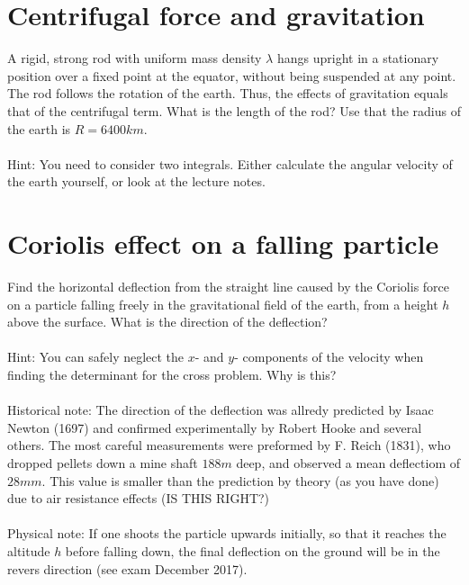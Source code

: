 \documentclass{article}
\begin{document}
    \section{Centrifugal force and gravitation}


    A rigid, strong rod with uniform mass density $\lambda$ hangs upright in a stationary position over a fixed point at the equator, without being suspended at any point. The rod follows the rotation of the earth. Thus, the effects of gravitation equals that of the centrifugal term. What is the length of the rod? Use that the radius of the earth is $R = 6400 \si{km}$.
    \\
    \\
    Hint: You need to consider two integrals. Either calculate the angular velocity of the earth yourself, or look at the lecture notes.

    \section{Coriolis effect on a falling particle}
    Find the horizontal deflection from the straight line caused by the Coriolis force on a particle falling freely in the gravitational field of the earth, from a height $h$ above the surface. What is the direction of the deflection?
    \\
    \\
    Hint: You can safely neglect the $x$- and $y$- components of the velocity when finding the determinant for the cross problem. Why is this?
    \\
    \\
    Historical note: The direction of the deflection was allredy predicted by Isaac Newton (1697) and confirmed experimentally by Robert Hooke and several others. The most careful measurements were preformed by F. Reich (1831), who dropped pellets down a mine shaft $188 \si{m}$ deep, and observed a mean deflectiom of $28 \si{mm}$. This value is smaller than the prediction by theory (as you have done) due to air resistance effects (IS THIS RIGHT?)
    \\
    \\
    Physical note: If one shoots the particle upwards initially, so that it reaches the altitude $h$ before falling down, the final deflection on the ground will be in the revers direction (see exam December 2017).
\end{document}
